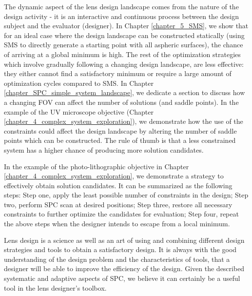 The dynamic aspect of the lens design landscape comes from the nature of the design activity - it is an interactive and continuous process between the design subject and the evaluator (designer). In Chapter \ref{chapter_5_SMS}, we show that for an ideal case where the design landscape can be constructed statically (using SMS to directly generate a starting point with all aspheric surfaces), the chance of arriving at a global minimum is high. The rest of the optimization strategies which involve gradually following a changing design landscape, are less effective: they either cannot find a satisfactory minimum or require a large amount of optimization cycles compared to SMS. In Chapter \ref{chapter_SPC_simple_system_landscape}, we dedicate a section to discuss how a changing FOV can affect the number of solutions (and saddle points). In the example of the UV microscope objective (Chapter \ref{chapter_4_complex_system_exploration}), we demonstrate how the use of the constraints could affect the design landscape by altering the number of saddle points which can be constructed. The rule of thumb is that a less constrained system has a higher chance of producing more solution candidates. 

In the example of the photo-lithographic objective in Chapter \ref{chapter_4_complex_system_exploration}, we demonstrate a strategy to effectively obtain solution candidates. It can be summarized as the following steps: Step one, apply the least possible number of constraints in the design; Step two, perform SPC scan at desired positions; Step three, restore all necessary constraints to further optimize the candidates for evaluation; Step four, repeat the above steps when the designer intends to escape from a local minimum.

Lens design is a science as well as an art of using and combining different design strategies and tools to obtain a satisfactory design. It is always with the good understanding of the design problem and the characteristics of tools, that a designer will be able to improve the efficiency of the design. Given the described systematic and adaptive aspects of SPC, we believe it can certainly be a useful tool in the lens designer's toolbox.  


